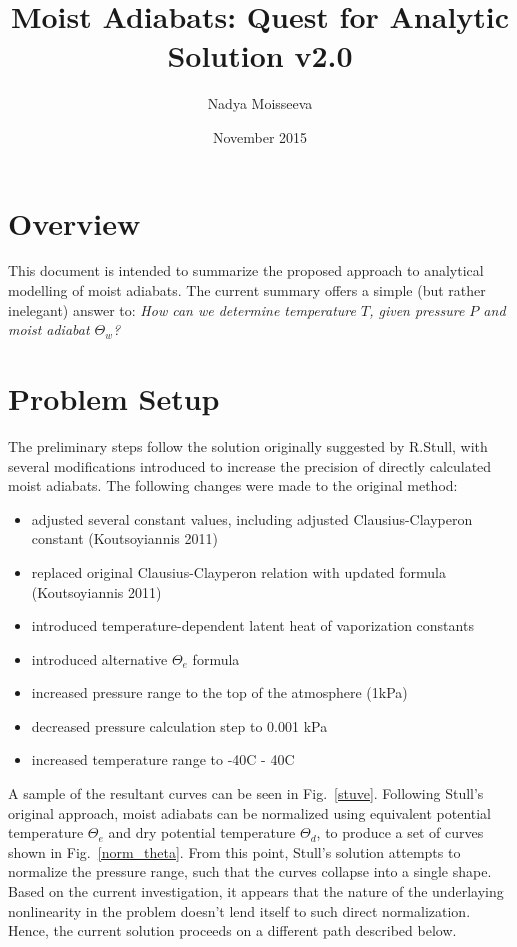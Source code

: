 \documentclass{article}
\begin{document}
\title{Moist Adiabats: Quest for Analytic Solution v2.0}
\author{Nadya Moisseeva}
\date{November 2015}    %

\maketitle

\newpage
\section*{Overview}
This document is intended to summarize the proposed approach to analytical modelling of moist adiabats. The current summary offers a simple (but rather inelegant) answer to: \emph{How can we determine temperature $T$, given pressure $P$ and moist adiabat $\Theta_w$?}

\FloatBarrier
\section*{Problem Setup}
The preliminary steps follow the solution originally suggested by R.Stull, with several modifications introduced to increase the precision of directly calculated moist adiabats. The following changes were made to the original method:
\begin{itemize}
\item{adjusted several constant values, including adjusted Clausius-Clayperon constant (Koutsoyiannis 2011)}
\item{replaced original Clausius-Clayperon relation with updated formula (Koutsoyiannis 2011)}
\item{introduced temperature-dependent latent heat of vaporization constants}
\item{introduced alternative $\Theta_e$ formula}
\item{increased pressure range to the top of the atmosphere (1kPa)}
\item{decreased pressure calculation step to 0.001 kPa}
\item{increased temperature range to -40C - 40C}
\end{itemize}

A sample of the resultant curves can be seen in Fig.~\ref{stuve}. Following Stull's original approach, moist adiabats can be normalized using equivalent potential temperature $\Theta_e$ and dry potential temperature $\Theta_d$, to produce a set of curves shown in Fig.~\ref{norm_theta}. From this point, Stull's solution attempts to normalize the pressure range, such that the curves collapse into a single shape. Based on the current investigation, it appears that the nature of the underlaying nonlinearity in the problem doesn't lend itself to such direct normalization. Hence, the current solution proceeds on a different path described below. 
\end{document}

